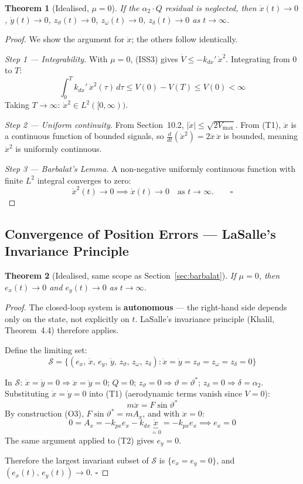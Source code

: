 \documentclass[11pt,a4paper]{article}
\theoremstyle{plain}
\newtheorem{theorem}{Theorem}[section]
\theoremstyle{remark}
\newcommand{\vth}{\vartheta}
\newcommand{\vths}{\vartheta^*}
\newcommand{\zth}{z_{\vth}}
\newcommand{\zom}{z_{\omega}}
\newcommand{\zdel}{z_{\delta}}
\begin{document}
\begin{theorem}[Idealised, $\mu = 0$]
If the $\alpha_2 \cdot Q$ residual is neglected, then $\dot x(t) \to 0$, $\dot y(t) \to 0$, $\zth(t) \to 0$, $\zom(t) \to 0$, $\zdel(t) \to 0$ as $t \to \infty$.
\end{theorem}

\begin{proof}
We show the argument for $\dot x$; the others follow identically.

\textit{Step 1 --- Integrability.} With $\mu = 0$, (ISS3) gives $\dot V \leq -k_{dx}'\,\dot x^2$. Integrating from $0$ to $T$:
\[
  \int_0^T k_{dx}'\,\dot x^2(\tau)\,d\tau \leq V(0) - V(T) \leq V(0) < \infty
\]
Taking $T \to \infty$: $\dot x^2 \in L^2([0,\infty))$.

\textit{Step 2 --- Uniform continuity.} From Section~10.2, $|\dot x| \leq \sqrt{2V_{\max}}$. From (T1), $\ddot x$ is a continuous function of bounded signals, so $\tfrac{d}{dt}(\dot x^2) = 2\dot x\,\ddot x$ is bounded, meaning $\dot x^2$ is uniformly continuous.

\textit{Step 3 --- Barbalat's Lemma.} A non-negative uniformly continuous function with finite $L^2$ integral converges to zero:
\[
  \dot x^2(t) \to 0 \implies \dot x(t) \to 0 \quad \text{as } t \to \infty. \qquad \square
\]
\end{proof}

\subsection{Convergence of Position Errors --- LaSalle's Invariance Principle}
\label{sec:lasalle}

\begin{theorem}[Idealised, same scope as Section~\ref{sec:barbalat}]
If $\mu = 0$, then $e_x(t) \to 0$ and $e_y(t) \to 0$ as $t \to \infty$.
\end{theorem}

\begin{proof}
The closed-loop system is \textbf{autonomous} --- the right-hand side depends only on the state, not explicitly on $t$. LaSalle's invariance principle (Khalil, Theorem~4.4) therefore applies.

Define the limiting set:
\[
  \mathcal{S} = \bigl\{(e_x,\, \dot x,\, e_y,\, \dot y,\, \zth,\, \zom,\, \zdel) : \dot x = \dot y = \zth = \zom = \zdel = 0\bigr\}
\]

In $\mathcal{S}$: $\dot x = \dot y = 0 \Rightarrow \ddot x = \ddot y = 0$; $Q = 0$; $\zth = 0 \Rightarrow \vth = \vths$; $\zdel = 0 \Rightarrow \delta = \alpha_2$. Substituting $\dot x = \dot y = 0$ into (T1) (aerodynamic terms vanish since $V = 0$):
\[
  m\ddot x = F\sin\vths
\]
By construction (O3), $F\sin\vths = mA_x$, and with $\ddot x = 0$:
\[
  0 = A_x = -k_{px}e_x - k_{dx}\underbrace{\dot x}_{=0} = -k_{px}e_x \implies e_x = 0
\]
The same argument applied to (T2) gives $e_y = 0$.

Therefore the largest invariant subset of $\mathcal{S}$ is $\{e_x = e_y = 0\}$, and $(e_x(t),\, e_y(t)) \to 0$. $\square$
\end{proof}
\end{document}
